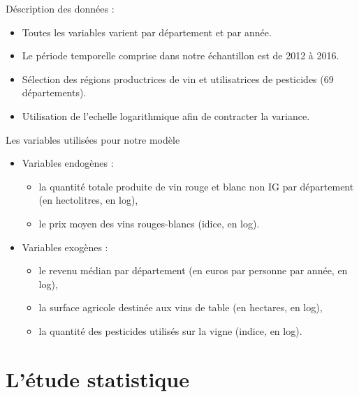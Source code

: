 \documentclass[11pt,ignorenonframetext,]{beamer}
\providecommand{\tightlist}{%
  \setlength{\itemsep}{0pt}\setlength{\parskip}{0pt}}
\begin{document}
\begin{frame}{Déscription des données :}
\protect\hypertarget{description-des-donnees}{}

\begin{itemize}
\tightlist
\item
  Toutes les variables varient par département et par année.
\item
  Le période temporelle comprise dans notre échantillon est de 2012 à
  2016.
\item
  Sélection des régions productrices de vin et utilisatrices de
  pesticides (69 départements).
\item
  Utilisation de l'echelle logarithmique afin de contracter la variance.
\end{itemize}

\end{frame}

\begin{frame}{Les variables utilisées pour notre modèle}
\protect\hypertarget{les-variables-utilisees-pour-notre-modele}{}

\begin{itemize}
\tightlist
\item
  Variables endogènes :

  \begin{itemize}
  \tightlist
  \item
    la quantité totale produite de vin rouge et blanc non IG par
    département (en hectolitres, en log),
  \item
    le prix moyen des vins rouges-blancs (idice, en log).
  \end{itemize}
\item
  Variables exogènes :

  \begin{itemize}
  \tightlist
  \item
    le revenu médian par département (en euros par personne par année,
    en log),
  \item
    la surface agricole destinée aux vins de table (en hectares, en
    log),
  \item
    la quantité des pesticides utilisés sur la vigne (indice, en log).
  \end{itemize}
\end{itemize}

\end{frame}

\hypertarget{letude-statistique}{%
\section{L'étude statistique}\label{letude-statistique}}
\end{document}
